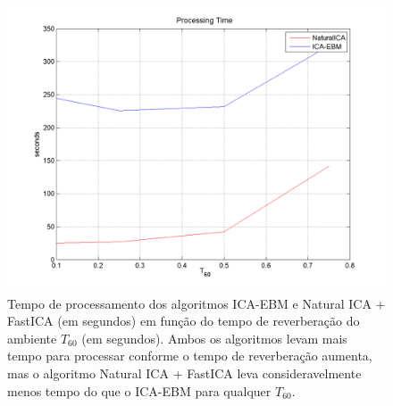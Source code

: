       
\begin{figure}
    \centering
        \includegraphics[scale=0.5]{figuras/comparison_convergence_ts.png}
            \caption{Tempo de processamento dos algoritmos ICA-EBM e Natural ICA + FastICA (em segundos) em função do tempo de reverberação do ambiente $T_{60}$ (em segundos). Ambos os algoritmos levam mais tempo para processar conforme o tempo de reverberação aumenta, mas o algoritmo Natural ICA + FastICA leva consideravelmente menos tempo do que o ICA-EBM para qualquer $T_{60}$.}
    \label{fig:comparison_convergence_ts}
\end{figure}


